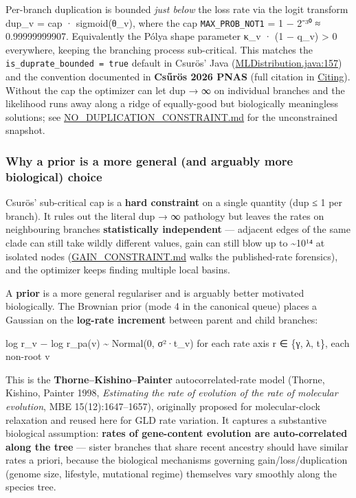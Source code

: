 \documentclass[
  10pt,
]{article}
\begin{document}
Per-branch duplication is bounded \emph{just below} the loss rate via
the logit transform dup\_v = cap · sigmoid(θ\_v), where the cap
\texttt{MAX\_PROB\_NOT1} = 1 − 2⁻³⁰ ≈ 0.99999999907. Equivalently the
Pólya shape parameter κ\_v · (1 − q\_v) \textgreater{} 0 everywhere,
keeping the branching process sub-critical. This matches the
\texttt{is\_duprate\_bounded\ =\ true} default in Csurös' Java
(\href{https://github.com/miklosc/Count/blob/master/src/count/model/MLDistribution.java\#L157}{MLDistribution.java:157})
and the convention documented in \textbf{Csűrös 2026 PNAS} (full
citation in \hyperref[citing]{Citing}). Without the cap the optimizer
can let dup → ∞ on individual branches and the likelihood runs away
along a ridge of equally-good but biologically meaningless solutions;
see \url{NO_DUPLICATION_CONSTRAINT.md} for the unconstrained snapshot.

\subsubsection{Why a prior is a more general (and arguably more
biological)
choice}\label{why-a-prior-is-a-more-general-and-arguably-more-biological-choice}

Csurös' sub-critical cap is a \textbf{hard constraint} on a single
quantity (dup ≤ 1 per branch). It rules out the literal dup → ∞
pathology but leaves the rates on neighbouring branches
\textbf{statistically independent} --- adjacent edges of the same clade
can still take wildly different values, gain can still blow up to
\textasciitilde10¹⁴ at isolated nodes (\url{GAIN_CONSTRAINT.md} walks
the published-rate forensics), and the optimizer keeps finding multiple
local basins.

A \textbf{prior} is a more general regulariser and is arguably better
motivated biologically. The Brownian prior (mode 4 in the canonical
queue) places a Gaussian on the \textbf{log-rate increment} between
parent and child branches:

log r\_v − log r\_pa(v) \textasciitilde{} Normal(0, σ²·t\_v) for each
rate axis r ∈ \{γ, λ, t\}, each non-root v

This is the \textbf{Thorne--Kishino--Painter} autocorrelated-rate model
(Thorne, Kishino, Painter 1998, \emph{Estimating the rate of evolution
of the rate of molecular evolution}, MBE 15(12):1647--1657), originally
proposed for molecular-clock relaxation and reused here for GLD rate
variation. It captures a substantive biological assumption:
\textbf{rates of gene-content evolution are auto-correlated along the
tree} --- sister branches that share recent ancestry should have similar
rates a priori, because the biological mechanisms governing
gain/loss/duplication (genome size, lifestyle, mutational regime)
themselves vary smoothly along the species tree.
\end{document}
